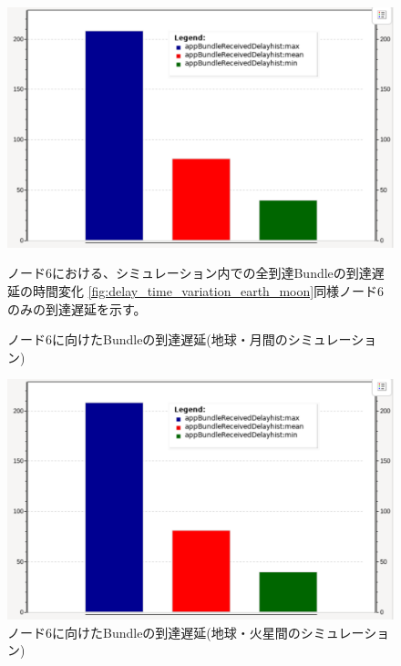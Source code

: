 \begin{figure}[tbh]
    \centering
    \includegraphics[width=0.7\textheight]{img/thesis_sample_delay_hist.pdf}
    \caption{ノード6に向けたBundleの到達遅延(地球・月間のシミュレーション)}
    \label{fig:total_delay_histgram_earth_moon}
    \begin{minipage}{\textwidth}
        \raggedright
        ノード6における、シミュレーション内での全到達Bundleの到達遅延の時間変化
        \ref{fig:delay_time_variation_earth_moon}同様ノード6のみの到達遅延を示す。
    \end{minipage}
\end{figure}

\begin{figure}[tbh]
    \centering
    \includegraphics[width=0.7\textheight]{img/thesis_sample_delay_hist.pdf}
    \caption{ノード6に向けたBundleの到達遅延(地球・火星間のシミュレーション)}
    \label{fig:total_delay_histgram_earth_mars}
    \begin{minipage}{\textwidth}
        \raggedright
    \end{minipage}
\end{figure}

